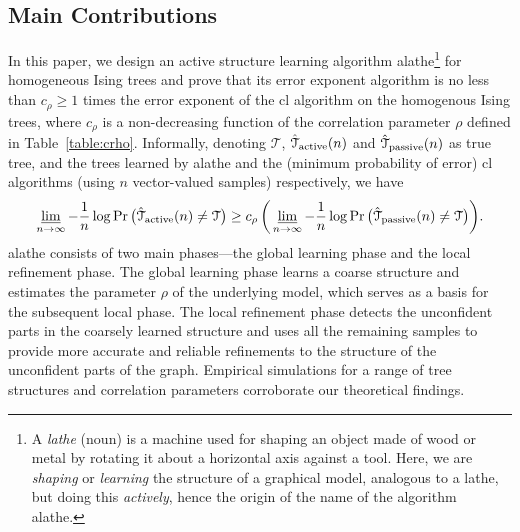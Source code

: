 \documentclass[11pt,onecolumn]{article}
\newcommand{\calT}{\mathcal{T}}
\newcommand{\hatcalT}{\hat{\calT}}
\newcommand{\Passive}{{\rm passive}}
\newcommand{\Active}{{\rm active}}
\begin{document}
\renewcommand{\thefootnote}{\arabic{footnote}}
\subsection{Main Contributions}
In this paper, we design an active structure learning algorithm \ac{alathe}\footnote{A \emph{lathe} (noun) is a machine used for shaping an object made of wood or metal by   rotating it about a horizontal axis against a tool. Here,  we are  {\em shaping} or {\em learning}  the structure of a graphical model, analogous to  a lathe, but doing this {\em actively}, hence the origin of the name of the algorithm \ac{alathe}.} for homogeneous Ising trees and prove that its error exponent   algorithm is no less than $c_{\rho}\geq 1$ times the error exponent of the \ac{cl} algorithm on the homogenous Ising trees, where $c_{\rho}$ is a non-decreasing function of the correlation parameter $\rho$ defined in Table~\ref{table:crho}. Informally, denoting $\calT$, $\hatcalT_{\Active}(n)$ and $\hatcalT_{\Passive}(n)$ as true tree, and  the trees learned by \ac{alathe} and the (minimum probability of error) \ac{cl} algorithms (using $n$ vector-valued samples) respectively,  we have
\begin{equation}
    \varliminf_{n\rightarrow \infty}-\frac{1}{n}\log \Pr \big(\hatcalT_{\Active}(n)\neq \calT\big)\ge c_\rho\,\bigg( \varliminf_{n\rightarrow \infty}-\frac{1}{n}\log \Pr \big(\hatcalT_{\Passive}(n)\neq \calT\big)\bigg).
\end{equation}
\ac{alathe} consists of two main phases---the global learning phase and the local refinement phase. The global learning phase learns a coarse structure and estimates the parameter $\rho$ of the underlying model, which serves as a basis for the 
subsequent local phase. The local refinement phase detects the unconfident parts in the coarsely learned structure and uses all the remaining samples to provide more accurate and reliable refinements to the structure of the unconfident parts of the graph.  Empirical simulations for a range of tree structures and correlation parameters corroborate our theoretical findings. 
\end{document}

